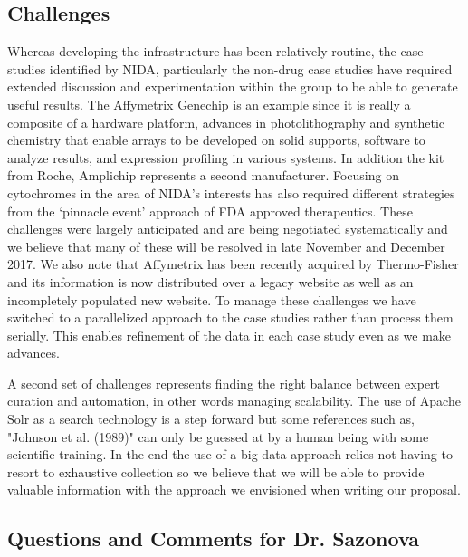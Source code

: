 \documentclass[11pt, oneside]{article}   	%
\begin{document}
\subsection*{Challenges} Whereas developing the infrastructure has been relatively routine, the case studies identified by NIDA, particularly the non-drug case studies have required extended discussion and experimentation within the group to be able to generate useful results. The Affymetrix Genechip is an example since it is really a composite of a hardware platform, advances in photolithography and synthetic chemistry that enable arrays to be developed on solid supports, software to analyze results, and expression profiling in various systems. In addition the kit from Roche, Amplichip represents a second manufacturer. Focusing on cytochromes in the area of NIDA's interests has also required different strategies from the `pinnacle event' approach of FDA approved therapeutics. These challenges were largely anticipated and are being negotiated systematically and we believe that many of these will be resolved in late November and December 2017. We also note that Affymetrix has been recently acquired by Thermo-Fisher and its information is now distributed over a legacy website as well as an incompletely populated new website. To manage these challenges we have switched to a parallelized approach to the case studies rather than process them serially. This enables refinement of the data in each case study even as we make advances. 

A second set of challenges represents finding the right balance between expert curation and automation, in other words managing scalability. The use of Apache Solr as a search technology is a step forward but some references such as, "Johnson et al. (1989)" can only be guessed at by a human being with some scientific training. In the end the use of a big data approach relies not having to resort to exhaustive collection so we believe that we will be able to provide valuable information with the approach we envisioned when writing our proposal. 

\subsection*{Questions and Comments for Dr. Sazonova}
\end{document}
